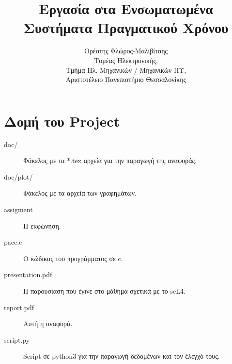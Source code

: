 
\usepackage{fontspec}
\setmainfont{DejaVu Serif}
\renewcommand{\contentsname}{Περιεχόμενα}
\renewcommand{\listfigurename}{Λίστα Σχημάτων}
\renewcommand{\figurename}{Σχήμα}
\renewcommand{\lstlistingname}{Καταχώρηση}
\renewcommand{\lstlistlistingname}{List of \lstlistingname s}

\title{Εργασία στα Ενσωματωμένα Συστήματα Πραγματικού Χρόνου}
\author{Ορέστης Φλώρος-Μαλιβίτσης\\
  Τομέας Ηλεκτρονικής,\\
  Τμήμα Ηλ. Μηχανικών / Μηχανικών ΗΥ,\\
  Αριστοτέλειο Πανεπιστήμιο Θεσσαλονίκης}


\maketitle
\tableofcontents
\newpage

\chapter*{Δομή του Project} \label{project-structure}

\begin{description}
	\item[doc/] Φάκελος με τα *.tex αρχεία για την παραγωγή της αναφοράς.
	\item[doc/plot/] Φάκελος με τα αρχεία των γραφημάτων.
	\item[assigment] Η εκφώνηση.
	\item[pace.c] Ο κώδικας του προγράμματος σε c.
	\item[presentation.pdf] Η παρουσίαση που έγινε στο μάθημα σχετικά με το seL4.
	\item[report.pdf] Αυτή η αναφορά.
	\item[script.py] Script σε python3 για την παραγωγή δεδομένων και τον έλεγχό τους.
\end{description}







